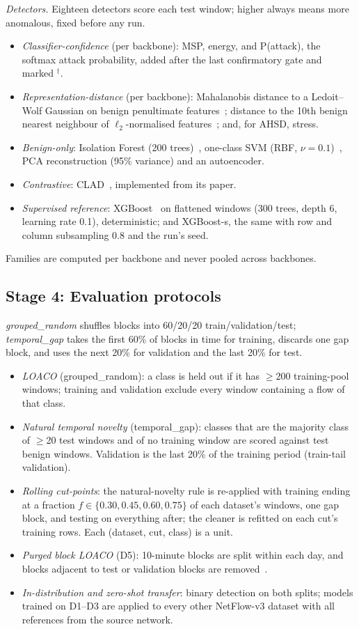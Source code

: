\documentclass[conference]{IEEEtran}
\newcommand{\dg}{$^\dagger$}
\begin{document}
\emph{Detectors.} Eighteen detectors score each test window; higher always means more anomalous, fixed before any run.
\begin{itemize}
\item \emph{Classifier-confidence} (per backbone): MSP, energy, and P(attack), the softmax attack probability, added after the last confirmatory gate and marked \dg.
\item \emph{Representation-distance} (per backbone): Mahalanobis distance to a Ledoit--Wolf Gaussian on benign penultimate features~\cite{lee2018}; distance to the 10th benign nearest neighbour of $\ell_2$-normalised features~\cite{sun2022knn}; and, for AHSD, stress.
\item \emph{Benign-only}: Isolation Forest (200 trees)~\cite{liu2008if}, one-class SVM (RBF, $\nu{=}0.1$)~\cite{scholkopf2001}, PCA reconstruction (95\% variance) and an autoencoder.
\item \emph{Contrastive}: CLAD~\cite{wilkie2026}, implemented from its paper.
\item \emph{Supervised reference}: XGBoost~\cite{chen2016xgb} on flattened windows (300 trees, depth 6, learning rate 0.1), deterministic; and XGBoost-s, the same with row and column subsampling 0.8 and the run's seed.
\end{itemize}
Families are computed per backbone and never pooled across backbones.

\subsection{Stage 4: Evaluation protocols}\label{sec:protocols}
\emph{grouped\_random} shuffles blocks into 60/20/20 train/validation/test; \emph{temporal\_gap} takes the first 60\% of blocks in time for training, discards one gap block, and uses the next 20\% for validation and the last 20\% for test.
\begin{itemize}
\item \emph{LOACO} (grouped\_random): a class is held out if it has $\geq$200 training-pool windows; training and validation exclude every window containing a flow of that class.
\item \emph{Natural temporal novelty} (temporal\_gap): classes that are the majority class of $\geq$20 test windows and of no training window are scored against test benign windows. Validation is the last 20\% of the training period (train-tail validation).
\item \emph{Rolling cut-points}: the natural-novelty rule is re-applied with training ending at a fraction $f\in\{0.30,0.45,0.60,0.75\}$ of each dataset's windows, one gap block, and testing on everything after; the cleaner is refitted on each cut's training rows. Each (dataset, cut, class) is a unit.
\item \emph{Purged block LOACO} (D5): 10-minute blocks are split within each day, and blocks adjacent to test or validation blocks are removed~\cite{lopezdeprado2018}.
\item \emph{In-distribution and zero-shot transfer}: binary detection on both splits; models trained on D1--D3 are applied to every other NetFlow-v3 dataset with all references from the source network.
\end{itemize}
\end{document}

